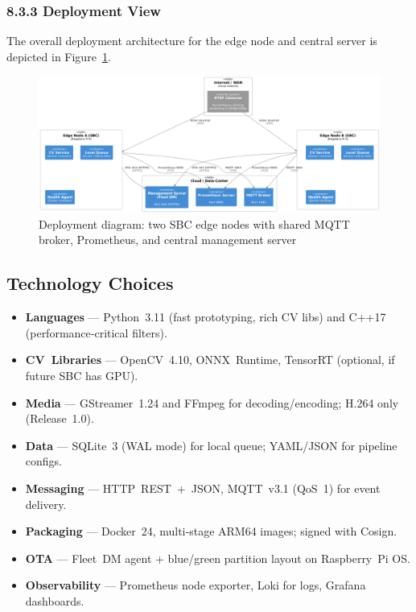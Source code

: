 \documentclass[11pt,a4paper]{article}
\begin{document}
\subsubsection*{8.3.3 Deployment View}
The overall deployment architecture for the edge node and central server is depicted in Figure~\ref{fig:deploy}.

\begin{figure}[H]
  \centering
  \includegraphics[width=1.0\textwidth]{fig/deployment_multi_sbc.png}
  \caption{Deployment diagram: two SBC edge nodes with shared MQTT broker, Prometheus, and central management server}
  \label{fig:deploy}
\end{figure}

\subsection{Technology Choices}

\begin{itemize}
  \item \textbf{Languages} — Python 3.11 (fast prototyping, rich CV libs) and C++17 (performance‑critical filters).
  \item \textbf{CV Libraries} — OpenCV 4.10, ONNX Runtime, TensorRT (optional, if future SBC has GPU).
  \item \textbf{Media} — GStreamer 1.24 and FFmpeg for decoding/encoding; H.264 only (Release 1.0).
  \item \textbf{Data} — SQLite 3 (WAL mode) for local queue; YAML/JSON for pipeline configs.
  \item \textbf{Messaging} — HTTP REST + JSON, MQTT v3.1 (QoS 1) for event delivery.
  \item \textbf{Packaging} — Docker 24, multi‑stage ARM64 images; signed with Cosign.
  \item \textbf{OTA} — Fleet DM agent + blue/green partition layout on Raspberry Pi OS.
  \item \textbf{Observability} — Prometheus node exporter, Loki for logs, Grafana dashboards.
\end{itemize}
\end{document}
